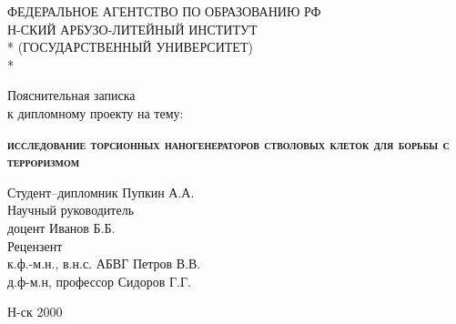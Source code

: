 \begin{titlepage}
\newpage		

\begin{center}
ФЕДЕРАЛЬНОЕ АГЕНТСТВО ПО ОБРАЗОВАНИЮ РФ \\
\vspace{1cm}
Н-СКИЙ АРБУЗО-ЛИТЕЙНЫЙ ИНСТИТУТ \\*
(ГОСУДАРСТВЕННЫЙ УНИВЕРСИТЕТ) \\*
\hrulefill
\end{center}
 
\vspace{8em}

\begin{center}
\Large Пояснительная записка \\ к дипломному проекту на тему:
\end{center}

\vspace{2.5em}
 
\begin{center}
\textsc{\textbf{исследование торсионных наногенераторов \linebreak стволовых клеток для борьбы с терроризмом}}
\end{center}

\vspace{6em}
 
\begin{flushleft}
Студент--дипломник \hrulefill Пупкин А.А. \\
\vspace{1.5em}
Научный руководитель \\
доцент \hrulefill Иванов Б.Б.\\
\vspace{1.5em}
Рецензент \\
к.ф.-м.н., в.н.с. АБВГ \hrulefill Петров В.В.\\
\vspace{1.5em}
д.ф-м.н, профессор \hrulefill Сидоров Г.Г.
\end{flushleft}
 
\vspace{\fill}

\begin{center}
Н-ск 2000
\end{center}

\end{titlepage}